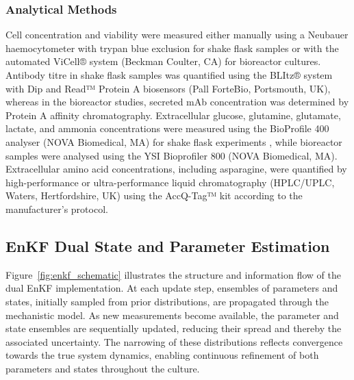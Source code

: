 \subsubsection{Analytical Methods}
Cell concentration and viability were measured either manually using a Neubauer haemocytometer with trypan blue exclusion for shake flask samples or with the automated ViCell® system (Beckman Coulter, CA) for bioreactor cultures. Antibody titre in shake flask samples was quantified using the BLItz® system with Dip and Read™ Protein A biosensors (Pall ForteBio, Portsmouth, UK), whereas in the bioreactor studies, secreted mAb concentration was determined by Protein A affinity chromatography. Extracellular glucose, glutamine, glutamate, lactate, and ammonia concentrations were measured using the BioProfile 400 analyser (NOVA Biomedical, MA) for shake flask experiments , while bioreactor samples were analysed using the YSI Bioprofiler 800 (NOVA Biomedical, MA). Extracellular amino acid concentrations, including asparagine, were quantified by high-performance or ultra-performance liquid chromatography (HPLC/UPLC, Waters, Hertfordshire, UK) using the AccQ-Tag™ kit according to the manufacturer’s protocol.

\subsection{EnKF Dual State and Parameter Estimation}
Figure~\ref{fig:enkf_schematic} illustrates the structure and information flow of the dual EnKF implementation. At each update step, ensembles of parameters and states, initially sampled from prior distributions, are propagated through the mechanistic model. As new measurements become available, the parameter and state ensembles are sequentially updated, reducing their spread and thereby the associated uncertainty. The narrowing of these distributions reflects convergence towards the true system dynamics, enabling continuous refinement of both parameters and states throughout the culture.



